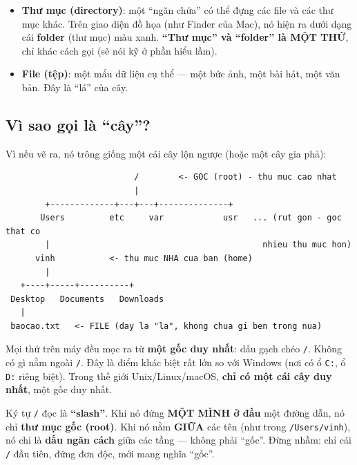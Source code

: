 \documentclass[12pt,a4paper]{article}
\begin{document}
\begin{notebox}[title={Thuật ngữ}]
\begin{itemize}[leftmargin=*]
  \item \textbf{Thư mục (directory)}: một ``ngăn chứa'' có thể đựng các file và các thư mục khác. Trên giao diện đồ họa (như Finder của Mac), nó hiện ra dưới dạng cái \textbf{folder} (thư mục) màu xanh. \textbf{``Thư mục'' và ``folder'' là MỘT THỨ}, chỉ khác cách gọi (sẽ nói kỹ ở phần hiểu lầm).
  \item \textbf{File (tệp)}: một mẩu dữ liệu cụ thể --- một bức ảnh, một bài hát, một văn bản. Đây là ``lá'' của cây.
\end{itemize}
\end{notebox}

\subsection{Vì sao gọi là ``cây''?}

Vì nếu vẽ ra, nó trông giống một cái cây lộn ngược (hoặc một cây gia phả):

\begin{codebox}
\begin{verbatim}
                          /        <- GOC (root) - thu muc cao nhat
                          |
        +-------------+---+---+--------------+
       Users         etc     var            usr   ... (rut gon - goc that co
        |                                           nhieu thu muc hon)
      vinh           <- thu muc NHA cua ban (home)
        |
   +----+-----+----------+
 Desktop   Documents   Downloads
   |
 baocao.txt   <- FILE (day la "la", khong chua gi ben trong nua)
\end{verbatim}
\end{codebox}

Mọi thứ trên máy đều mọc ra từ \textbf{một gốc duy nhất}: dấu gạch chéo \texttt{/}. Không có gì nằm ngoài \texttt{/}. Đây là điểm khác biệt rất lớn so với Windows (nơi có ổ \texttt{C:}, ổ \texttt{D:} riêng biệt). Trong thế giới Unix/Linux/macOS, \textbf{chỉ có một cái cây duy nhất}, một gốc duy nhất.

\begin{notebox}[title={Lưu ý cách đọc dấu \texttt{/}}]
Ký tự \texttt{/} đọc là \textbf{``slash''}. Khi nó đứng \textbf{MỘT MÌNH ở đầu} một đường dẫn, nó chỉ \textbf{thư mục gốc (root)}. Khi nó nằm \textbf{GIỮA} các tên (như trong \texttt{/Users/vinh}), nó chỉ là \textbf{dấu ngăn cách} giữa các tầng --- không phải ``gốc''. Đừng nhầm: chỉ cái \texttt{/} đầu tiên, đứng đơn độc, mới mang nghĩa ``gốc''.
\end{notebox}
\end{document}
